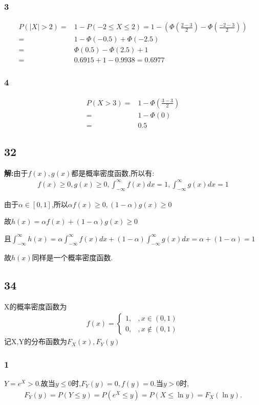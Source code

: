 \documentclass[12pt,a4paper,fontset=none]{ctexart}
\begin{document}
\subsubsection*{3}
\begin{align*}
    P(\vert X\vert>2)= & 1-P(-2\leq X\leq 2)=1-(\varPhi(\frac{2-3}{2} )-\varPhi(\frac{-2-3}{2} )) \\=&1-\varPhi(-0.5)+\varPhi(-2.5)\\=&\varPhi(0.5)-\varPhi(2.5)+1\\=&0.6915+1-0.9938=0.6977
\end{align*}
\subsubsection*{4}
\begin{align*}
    P(X>3)= & 1-\varPhi(\frac{3-3}{2} ) \\=&1-\varPhi(0)\\=&0.5
\end{align*}
\subsection*{32}
\textbf{解:}由于$f(x),g(x)$都是概率密度函数,所以有:
\begin{align*}
    f(x)\geq 0,g(x)\geq 0,\int_{-\infty}^{\infty}f(x)dx=1,\int_{-\infty}^{\infty}g(x)dx=1
\end{align*}

由于$\alpha\in[0,1]$,所以$\alpha f(x)\geq 0,(1-\alpha)g(x)\geq 0$

故$h(x)=\alpha f(x)+(1-\alpha)g(x)\geq 0$

且$\int_{-\infty}^{\infty}h(x)=\alpha\int_{-\infty}^{\infty}f(x)dx+(1-\alpha)\int_{-\infty}^{\infty}g(x)dx=\alpha+(1-\alpha)=1$

故$h(x)$同样是一个概率密度函数.
\subsection*{34}
X的概率密度函数为
\begin{align*}
    f(x)=
    \begin{cases}
        1,\text{} & ,x\in (0,1)     \\
        0,\text{} & ,x \notin (0,1)
    \end{cases}
\end{align*}
记X,Y的分布函数为$F_X(x),F_Y(y)$
\subsubsection*{1}
$Y=e^X>0.$故当$y\leq 0$时,$F_Y(y)=0,f(y)=0$.当$y>0$时,
\begin{align*}
    F_Y(y)=P(Y\leq y)=P(e^X\leq y)=P(X\leq \ln y)=F_X(\ln y).
\end{align*}
\end{document}

